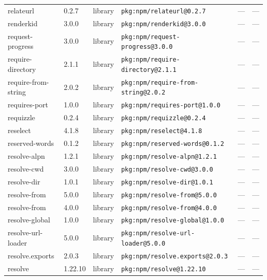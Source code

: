 \documentclass[11pt,a4paper]{article}
\begin{document}
\begin{longtable}{|p{4cm}|p{2cm}|p{1.6cm}|p{5cm}|p{1.5cm}|p{3.5cm}|}
\raggedright relateurl & 0.2.7 & library & \small\texttt{pkg:npm/relateurl@0.2.7} & — & \small — \\
\raggedright renderkid & 3.0.0 & library & \small\texttt{pkg:npm/renderkid@3.0.0} & — & \small — \\
\raggedright request-progress & 3.0.0 & library & \small\texttt{pkg:npm/request-progress@3.0.0} & — & \small — \\
\raggedright require-directory & 2.1.1 & library & \small\texttt{pkg:npm/require-directory@2.1.1} & — & \small — \\
\raggedright require-from-string & 2.0.2 & library & \small\texttt{pkg:npm/require-from-string@2.0.2} & — & \small — \\
\raggedright requires-port & 1.0.0 & library & \small\texttt{pkg:npm/requires-port@1.0.0} & — & \small — \\
\raggedright requizzle & 0.2.4 & library & \small\texttt{pkg:npm/requizzle@0.2.4} & — & \small — \\
\raggedright reselect & 4.1.8 & library & \small\texttt{pkg:npm/reselect@4.1.8} & — & \small — \\
\raggedright reserved-words & 0.1.2 & library & \small\texttt{pkg:npm/reserved-words@0.1.2} & — & \small — \\
\raggedright resolve-alpn & 1.2.1 & library & \small\texttt{pkg:npm/resolve-alpn@1.2.1} & — & \small — \\
\raggedright resolve-cwd & 3.0.0 & library & \small\texttt{pkg:npm/resolve-cwd@3.0.0} & — & \small — \\
\raggedright resolve-dir & 1.0.1 & library & \small\texttt{pkg:npm/resolve-dir@1.0.1} & — & \small — \\
\raggedright resolve-from & 5.0.0 & library & \small\texttt{pkg:npm/resolve-from@5.0.0} & — & \small — \\
\raggedright resolve-from & 4.0.0 & library & \small\texttt{pkg:npm/resolve-from@4.0.0} & — & \small — \\
\raggedright resolve-global & 1.0.0 & library & \small\texttt{pkg:npm/resolve-global@1.0.0} & — & \small — \\
\raggedright resolve-url-loader & 5.0.0 & library & \small\texttt{pkg:npm/resolve-url-loader@5.0.0} & — & \small — \\
\raggedright resolve.exports & 2.0.3 & library & \small\texttt{pkg:npm/resolve.exports@2.0.3} & — & \small — \\
\raggedright resolve & 1.22.10 & library & \small\texttt{pkg:npm/resolve@1.22.10} & — & \small — \\

\end{longtable}
\end{document}
